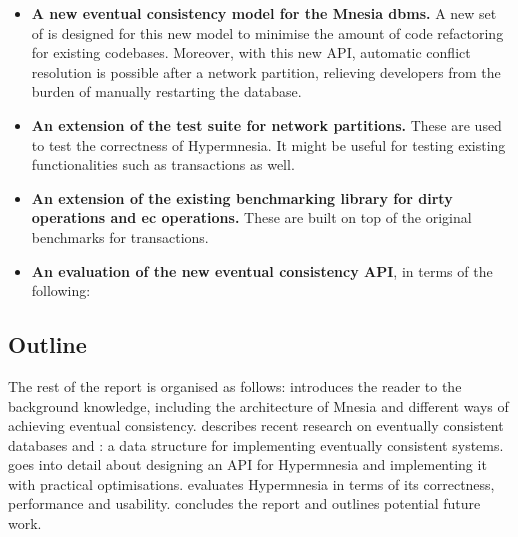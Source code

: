 \begin{itemize}
  \item \textbf{A new eventual consistency model for the Mnesia \acrshort{dbms}.}
  A new set of  is designed for this new model to minimise the 
  amount of code refactoring for existing codebases. Moreover, with this new API, 
  automatic conflict resolution is
  possible after a network partition, relieving developers from the burden
  of manually restarting the database.
  \item \textbf{An extension of the test suite for network partitions.}
  These are used to test the correctness of Hypermnesia. It might
  be useful for testing existing functionalities such as transactions as well.
  \item \textbf{An extension of the existing benchmarking library for dirty operations
  and \acrshort{ec} operations.} These are built on top of the original benchmarks 
  for transactions.
  \item \textbf{An evaluation of the new eventual consistency API}, in terms of the
  following:

\end{itemize}


\subsection{Outline} \label{sec:intro outline}

The rest of the report is organised as follows:  introduces the
reader to the background knowledge, including the architecture of Mnesia and
different ways of achieving eventual consistency.  describes
recent research on eventually consistent databases and : a data
structure for implementing eventually consistent systems.  goes 
into detail about designing an API for Hypermnesia and implementing it with practical optimisations.
 evaluates Hypermnesia in terms of its correctness,
performance and usability.  concludes the
report and outlines potential future work.

